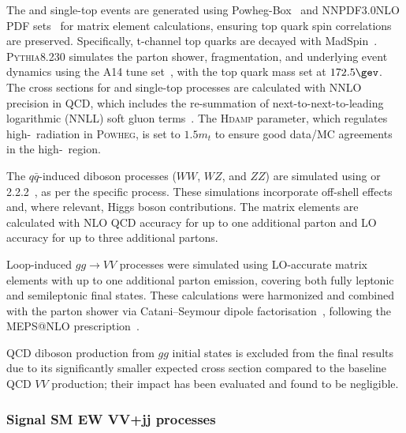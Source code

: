The \ttbar and single-top events are generated using Powheg-Box~\cite{Alioli:2010xd} and NNPDF3.0NLO PDF sets~\cite{Ball:2014uwa} for matrix element calculations, ensuring top quark spin correlations are preserved. 
Specifically, t-channel top quarks are decayed with MadSpin~\cite{Artoisenet:2012st}. 
\textsc{Pythia}8.230 simulates the parton shower, fragmentation, and underlying event dynamics using the A14 tune set~\cite{ATL-PHYS-PUB-2014-021}, with the top quark mass set at $172.5\gev$. 
The cross sections for \ttbar and single-top processes are calculated with NNLO precision in QCD, which includes the re-summation of next-to-next-to-leading logarithmic (NNLL) soft gluon terms~\cite{Czakon:2011xx,Kidonakis:2011wy,Kidonakis:2010tc,Kidonakis:2010ux}.
The \textsc{Hdamp} parameter, which regulates high-\pt\ radiation in \textsc{Powheg}, is set to $1.5m_{t}$ to ensure good data/MC agreements in the high-\pt\ region\cite{ATL-PHYS-PUB-2016-020}.

The $q\bar{q}$-induced diboson processes ($WW$, $WZ$, and $ZZ$) are simulated using \SHERPA[2.2.1] or 2.2.2~\cite{Bothmann:2019yzt}, as per the specific process. 
These simulations incorporate off-shell effects and, where relevant, Higgs boson contributions. 
The matrix elements are calculated with NLO QCD accuracy for up to one additional parton and LO accuracy for up to three additional partons.

Loop-induced $gg \to VV$ processes were simulated using LO-accurate matrix elements with up to one additional parton emission, covering both fully leptonic and semileptonic final states. These calculations were harmonized and combined with the \SHERPA parton shower via Catani--Seymour dipole factorisation~\cite{Gleisberg:2008fv,Schumann:2007mg}, following the MEPS@NLO prescription~\cite{Hoeche:2011fd,Hoeche:2012yf,Catani:2001cc,Hoeche:2009rj}.

QCD diboson production from $gg$ initial states is excluded from the final results due to its significantly smaller expected cross section compared to the baseline QCD $VV$ production; their impact has been evaluated and found to be negligible.


\subsubsection{Signal SM EW VV+jj processes}
\label{sec:mc_sample_ewvvjj}

